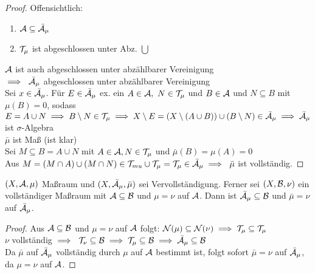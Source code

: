   \begin{proof}
    Offensichtlich:
    \begin{enumerate}
      \item $\mathcal{A} \subseteq \bar{\mathcal{A}}_{\mu}$
      \item $\mathcal{T}_{\mu}$ ist abgeschlossen unter Abz. $\bigcup$
    \end{enumerate}
    $\mathcal{A}$ ist auch abgeschlossen unter abzählbarer Vereinigung\\
    $\implies \ \bar{\mathcal{A}}_{\mu}$ abgeschlossen unter abzählbarer Vereinigung\\
    Sei $x \in \bar{\mathcal{A}}_{\mu}$. Für $E \in \bar{\mathcal{A}}_{\mu}$ ex. ein $A \in \mathcal{A}, \ N \in \mathcal{T}_{\mu}$ und $B \in \mathcal{A}$ und $N \subseteq B$ mit $\mu(B) = 0$, sodass $E = A \cup N \\ \implies B \setminus N \in \mathcal{T}_{\mu} \\ \implies X \setminus E = (X \setminus (A\cup B)) \cup (B \setminus N) \in \bar{\mathcal{A}}_{\mu} \\ \implies \bar{\mathcal{A}}_{\mu}$ ist $\sigma$-Algebra \\
    $\bar{\mu}$ ist Maß (ist klar)\\
    Sei $M \subseteq B = A \cup N$ mit $A \in \mathcal{A}, N \in \mathcal{T}_{\mu}$ und $\bar{\mu}(B) = \mu(A) = 0$ \\
    Aus $M = (M \cap A) \cup (M \cap N) \in \mathcal{T}_{mu} \cup \mathcal{T}_{\mu} = \mathcal{T}_{\mu} \in \bar{\mathcal{A}}_{\mu} \\ \implies \ \bar{\mu}$ ist vollständig.  
  \end{proof}

  \begin{theorem}
    $(X, \mathcal{A}, \mu)$ Maßraum und $(X, \bar{\mathcal{A}}_{\mu}, \bar{\mu})$ sei Vervollständigung. Ferner sei $(X, \mathcal{B}, \nu)$ ein vollständiger Maßraum mit $\mathcal{A} \subseteq \mathcal{B}$ und $\mu = \nu$ auf $\mathcal{A}$. Dann ist $\bar{\mathcal{A}}_{\mu} \subseteq \mathcal{B}$ und $\bar{\mu} = \nu$ auf $\bar{\mathcal{A}}_{\mu}$. 
  \end{theorem}

  \begin{proof}
    Aus $\mathcal{A} \subseteq \mathcal{B}$ und $\mu = \nu$ auf $\mathcal{A}$ folgt: $\mathcal{N}(\mu) \subseteq \mathcal{N}(\nu) \implies \mathcal{T}_{\mu} \subseteq \mathcal{T}_{\mu}$\\
    $\nu$ vollständig $\implies \ \mathcal{T}_{\nu} \subseteq \mathcal{B} \implies \mathcal{T}_{\mu} \subseteq \mathcal{B} \implies \bar{\mathcal{A}}_{\mu} \subseteq \mathcal{B}$\\
    Da $\bar{\mu}$ auf $\bar{\mathcal{A}}_{\mu}$ vollständig durch $\mu$ auf $\mathcal{A}$ bestimmt ist, folgt sofort $\bar{\mu} = \nu$ auf $\bar{\mathcal{A}}_{\mu}$, da $\mu = \nu$ auf $\mathcal{A}$.
  \end{proof}

